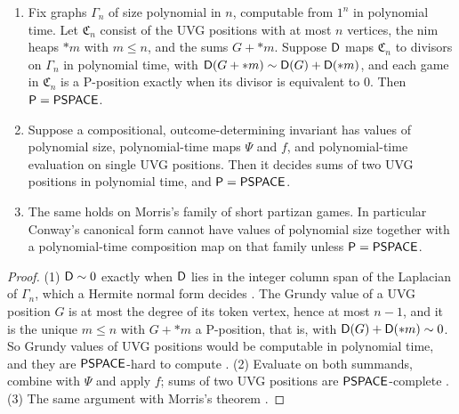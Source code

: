 \begin{theorem}\label{thm:hardness}
\begin{enumerate}[label=\textup{(\arabic*)}]
\item Fix graphs $\Gamma_n$ of size polynomial in $n$, computable from $1^n$ in polynomial time. Let $\mathfrak C_n$ consist of the UVG positions with at most $n$ vertices, the nim heaps $*m$ with $m\le n$, and the sums $G+*m$. Suppose $\mathsf{D}$ maps $\mathfrak C_n$ to divisors on $\Gamma_n$ in polynomial time, with $\mathsf{D}(G+*m)\sim\mathsf{D}(G)+\mathsf{D}(*m)$, and each game in $\mathfrak C_n$ is a P-position exactly when its divisor is equivalent to $0$. Then $\mathsf{P}=\mathsf{PSPACE}$.
\item Suppose a compositional, outcome-determining invariant has values of polynomial size, polynomial-time maps $\Psi$ and $f$, and polynomial-time evaluation on single UVG positions. Then it decides sums of two UVG positions in polynomial time, and $\mathsf{P}=\mathsf{PSPACE}$.
\item The same holds on Morris's family of short partizan games. In particular Conway's canonical form cannot have values of polynomial size together with a polynomial-time composition map on that family unless $\mathsf{P}=\mathsf{PSPACE}$.
\end{enumerate}
\end{theorem}
\begin{proof}
(1) $\mathsf{D}\sim0$ exactly when $\mathsf{D}$ lies in the integer column span of the Laplacian of $\Gamma_n$, which a Hermite normal form decides \cite{KannanBachem}. The Grundy value of a UVG position $G$ is at most the degree of its token vertex, hence at most $n-1$, and it is the unique $m\le n$ with $G+*m$ a P-position, that is, with $\mathsf{D}(G)+\mathsf{D}(*m)\sim0$. So Grundy values of UVG positions would be computable in polynomial time, and they are $\mathsf{PSPACE}$-hard to compute \cite{BFT}. (2) Evaluate on both summands, combine with $\Psi$ and apply $f$; sums of two UVG positions are $\mathsf{PSPACE}$-complete \cite{BFT}. (3) The same argument with Morris's theorem \cite{Morris}.
\end{proof}

